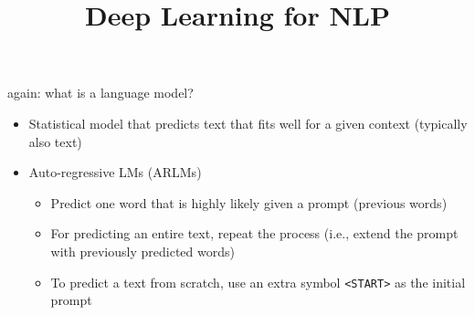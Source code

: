 \documentclass[11pt,compress,t,notes=noshow, xcolor=table]{beamer}
\title{Deep Learning for NLP}
\begin{document}


\begin{frame}{again: what is a language model?}

\vfill

\begin{itemize}
	\item Statistical model that predicts text that fits well for a given context (typically also text)
	\item Auto-regressive LMs (ARLMs)
	\begin{itemize}
		\item Predict one word that is highly likely given a prompt (previous words)
		\item For predicting an entire text, repeat the process (i.e., extend the prompt with previously predicted words)
		\item To predict a text from scratch, use an extra symbol \texttt{<START>} as the initial prompt
	\end{itemize}
\end{itemize}

\vfill

\end{frame}

\end{document}
